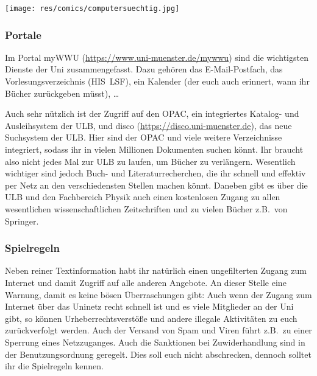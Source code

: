 \begin{multicols}{2}
\texttt{[image: res/comics/computersuechtig.jpg]}

\subsubsection*{Portale}
Im Portal myWWU (\url{https://www.uni-muenster.de/mywwu}) sind die wichtigsten Dienste der Uni zusammengefasst. Dazu gehören das E-Mail-Postfach, das Vorlesungsverzeichnis (HIS~LSF), ein Kalender (der euch auch erinnert, wann ihr Bücher zurückgeben müsst), \dots

Auch sehr nützlich ist der Zugriff auf den OPAC, ein integriertes Katalog- und Ausleihsystem der ULB, und disco (\url{https://disco.uni-muenster.de}), das neue Suchsystem der ULB. Hier sind der OPAC und viele weitere Verzeichnisse integriert, sodass ihr in vielen Millionen Dokumenten suchen könnt. Ihr braucht also nicht jedes Mal zur ULB zu laufen, um Bücher zu verlängern. Wesentlich wichtiger sind jedoch Buch- und Literaturrecherchen, die ihr schnell und effektiv per Netz an den verschiedensten Stellen machen könnt. Daneben gibt es über die ULB und den Fachbereich Physik auch einen kostenlosen Zugang zu allen wesentlichen wissenschaftlichen Zeitschriften und zu vielen Bücher z.B.\ von Springer.

\subsubsection*{Spielregeln}
Neben reiner Textinformation habt ihr natürlich einen ungefilterten Zugang zum Internet und damit Zugriff auf alle anderen Angebote. An dieser Stelle eine Warnung, damit es keine bösen Überraschungen gibt: Auch wenn der Zugang zum Internet über das Uninetz recht schnell ist und es viele Mitglieder an der Uni gibt, so können Urheberrechtsverstöße und andere illegale Aktivitäten zu euch zurückverfolgt werden. Auch der Versand von Spam und Viren führt z.B.\ zu einer Sperrung eines Netzzuganges. Auch die Sanktionen bei Zuwiderhandlung sind in der Benutzungsordnung geregelt. Dies soll euch nicht abschrecken, dennoch solltet ihr die Spielregeln kennen.


\end{multicols}
